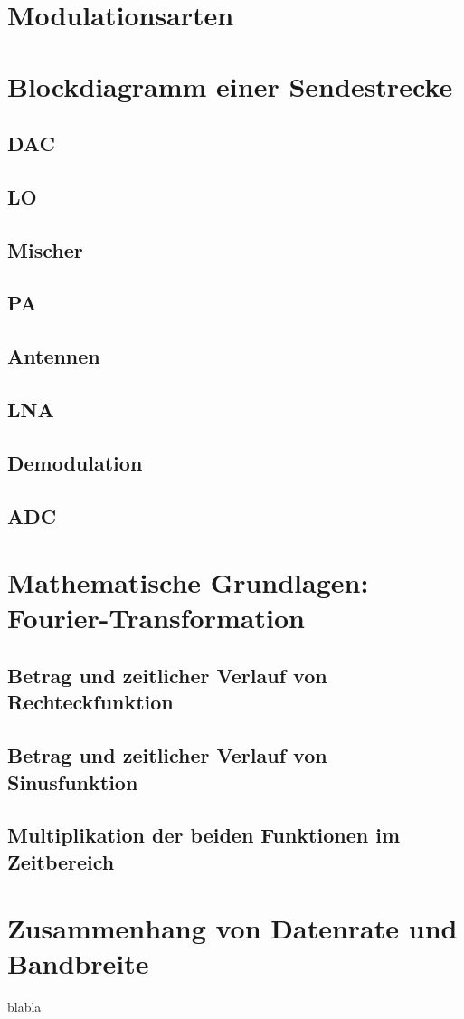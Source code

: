 \section{Modulationsarten}

\section{Blockdiagramm einer Sendestrecke}
\subsection{DAC}
\subsection{LO}
\subsection{Mischer} 
\subsection{PA}
\subsection{Antennen}
\subsection{LNA}
\subsection{Demodulation}
\subsection{ADC}
\section{Mathematische Grundlagen: Fourier-Transformation}
\subsection{Betrag und zeitlicher Verlauf von Rechteckfunktion}
\subsection{Betrag und zeitlicher Verlauf von Sinusfunktion}
\subsection{Multiplikation der beiden Funktionen im Zeitbereich}
\section{Zusammenhang von Datenrate und Bandbreite}
blabla
\clearpage